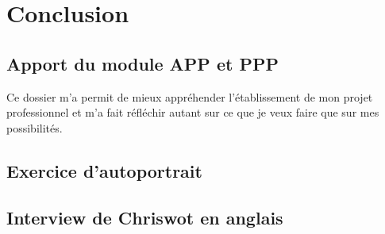 \documentclass[a4paper,12pt, draft]{report}
\begin{document}
\part{Conclusion}
\chapter{Apport du module APP et PPP}
Ce dossier m'a permit de mieux appréhender l'établissement de mon projet professionnel et m'a fait réfléchir autant sur ce que je veux faire que sur mes possibilités.

\listoftables{}

\tableofcontents{}


\appendix
\chapter{Exercice d'autoportrait}\label{autoportrait}


\chapter{Interview de Chriswot en anglais}
\end{document}
